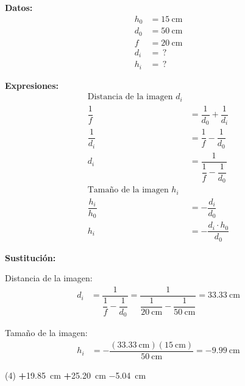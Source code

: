 \documentclass[12pt]{exam}
\begin{document}
\begin{questions}
    \vspace{0.3cm}
    \begin{minipage}[t]{0.35\linewidth}
    \textbf{Datos:}
    \begin{align*}
    h_{0} &= \SI{15}{\centi\meter} \\
    d_{0} &= \SI{50}{\centi\meter} \\
    f &= \SI{20}{\centi\meter} \\
    d_{i} &= \, ? \\
    h_{i} &= \, ?
    \end{align*}
    \end{minipage}
    \hspace{1cm}
    \begin{minipage}[t]{0.4\linewidth}
    \textbf{Expresiones:}
    \begin{align*}
    \text{Distancia de la imagen } d_{i} \\[0.3em]
    \dfrac{1}{f} &= \dfrac{1}{d_{0}} + \dfrac{1}{d_{i}} \\[0.3em]
    \dfrac{1}{d_{i}} &= \dfrac{1}{f} - \dfrac{1}{d_{0}} \\[0.4em]
    d_{i} &= \dfrac{1}{\dfrac{1}{f} - \dfrac{1}{d_{0}}} \\[0.5em]
    \text{Tamaño de la imagen } h_{i} \\[0.3em]
    \dfrac{h_{i}}{h_{0}} &= - \dfrac{d_{i}}{d_{0}} \\[0.5em]
    h_{i} &= - \dfrac{d_{i} \cdot h_{0}}{d_{0}} 
    \end{align*}
    \end{minipage}

    \vspace{0.3cm}
    \textbf{Sustitución:}

    Distancia de la imagen:
    \begin{align*}
    d_{i} &= \dfrac{1}{\dfrac{1}{f} - \dfrac{1}{d_{0}}} = \dfrac{1}{\dfrac{1}{\SI{20}{\centi\meter}} - \dfrac{1}{\SI{50}{\centi\meter}}} = \SI{33.33}{\centi\meter}
    \end{align*}

    \vspace{0.3cm}
    Tamaño de la imagen:
    \begin{align*}
    h_{i} &= - \dfrac{(\SI{33.33}{\centi\meter})(\SI{15}{\centi\meter})}{\SI{50}{\centi\meter}} = -\SI{9.99}{\centi\meter}
    \end{align*}
    
    \vspace{0.3cm}
    \begin{tasks}(4)
        \task \textbf{+}\SI{19.85}{\centi\meter}
        \task \textbf{+}\SI{25.20}{\centi\meter}
        \task \SI{-5.04}{\centi\meter}
        \task {}
    \end{tasks}


\end{questions}
\end{document}

